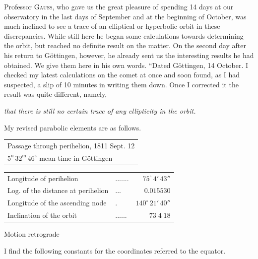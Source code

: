 \par\indent Professor \textsc{Gauss}, who gave us the great pleasure of spending 14 days at our observatory in the last days of September and at the beginning of October, was much inclined to see a trace of an elliptical or hyperbolic orbit in these discrepancies. While still here he began some calculations towards determining the orbit, but reached no definite result on the matter. On the second day after his return to Göttingen, however, he already sent us the interesting results he had obtained. We give them here in his own words. “Dated Göttingen, 14 October. I checked my latest calculations on the comet at once and soon found, as I had suspected, a slip of 10 minutes in writing them down. Once I corrected it the result was quite different, namely,

\begin{center}
\emph{that there is still no certain trace of any ellipticity in the orbit.}
\end{center}

\noindent My revised parabolic elements are as follows.

\begin{center}\fontsize{10}{12}\selectfont\setlength{\tabcolsep}{4pt}\renewcommand{\arraystretch}{1.15}\begin{tabular}{l}
Passage through perihelion, 1811 Sept. 12\\
\quad $5^{\mathrm u}\,32^{\mathrm m}\,46^{\mathrm s}$ mean time in Göttingen\\
\end{tabular}\end{center}
\begin{center}\fontsize{10}{12}\selectfont\setlength{\tabcolsep}{3pt}\renewcommand{\arraystretch}{1.15}\begin{tabular}{llr}
Longitude of perihelion & .\;.\;.\;.\;.\;.\;. & $75^\circ\,4'\,43''$\\
Log. of the distance at perihelion & .\;.\;. & $0.015530$\\
Longitude of the ascending node & . & $140^\circ\,21'\,40''$\\
Inclination of the orbit & .\;.\;.\;.\;.\;. & $73\;4\;18$\\
\end{tabular}\end{center}
\noindent Motion retrograde

\par\indent I find the following constants for the coordinates referred to the equator.

